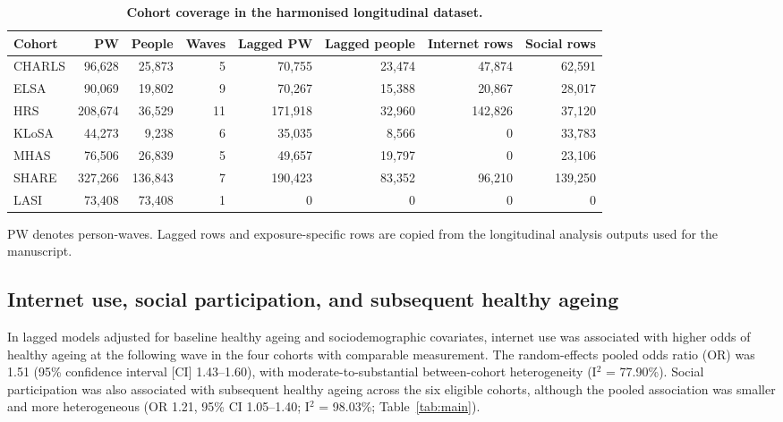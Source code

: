 \documentclass[pdflatex,sn-nature]{sn-jnl}
\begin{document}
\begin{table}[!htbp]
\caption{\textbf{Cohort coverage in the harmonised longitudinal dataset.}}
\label{tab:coverage}
\centering
\scriptsize
\setlength{\tabcolsep}{2pt}
\renewcommand{\arraystretch}{0.92}
\begin{tabular*}{\textwidth}{@{\extracolsep{\fill}}lrrrrrrr@{}}
\toprule
Cohort & PW & People & Waves & Lagged PW & Lagged people & Internet rows & Social rows \\
\midrule
CHARLS & 96,628 & 25,873 & 5 & 70,755 & 23,474 & 47,874 & 62,591 \\
ELSA & 90,069 & 19,802 & 9 & 70,267 & 15,388 & 20,867 & 28,017 \\
HRS & 208,674 & 36,529 & 11 & 171,918 & 32,960 & 142,826 & 37,120 \\
KLoSA & 44,273 & 9,238 & 6 & 35,035 & 8,566 & 0 & 33,783 \\
MHAS & 76,506 & 26,839 & 5 & 49,657 & 19,797 & 0 & 23,106 \\
SHARE & 327,266 & 136,843 & 7 & 190,423 & 83,352 & 96,210 & 139,250 \\
LASI & 73,408 & 73,408 & 1 & 0 & 0 & 0 & 0 \\
\bottomrule
\end{tabular*}
\renewcommand{\arraystretch}{1.0}
\par\raggedright\scriptsize PW denotes person-waves. Lagged rows and exposure-specific rows are copied from the longitudinal analysis outputs used for the manuscript.
\setlength{\tabcolsep}{6pt}
\end{table}
\FloatBarrier

\subsection{Internet use, social participation, and subsequent healthy ageing}

In lagged models adjusted for baseline healthy ageing and sociodemographic covariates, internet use was associated with higher odds of healthy ageing at the following wave in the four cohorts with comparable measurement. The random-effects pooled odds ratio (OR) was 1.51 (95\% confidence interval [CI] 1.43--1.60), with moderate-to-substantial between-cohort heterogeneity (I$^2$ = 77.90\%). Social participation was also associated with subsequent healthy ageing across the six eligible cohorts, although the pooled association was smaller and more heterogeneous (OR 1.21, 95\% CI 1.05--1.40; I$^2$ = 98.03\%; Table~\ref{tab:main}).
\end{document}
